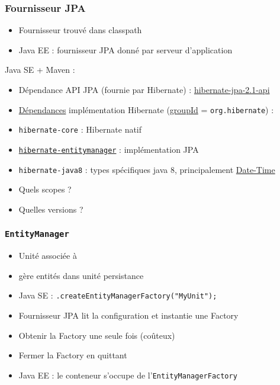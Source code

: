 \documentclass[english, french]{beamer}
\begin{document}
\begin{frame}
	\frametitle{Fournisseur JPA}
	\begin{itemize}
		\item Fournisseur trouvé dans classpath
		\item Java EE : fournisseur JPA donné par serveur d’application
	\end{itemize}
	Java SE + Maven :
	\begin{itemize}
		\item Dépendance API JPA (fournie par Hibernate) : \href{http://search.maven.org/\#search|gav|1|g\%3A\%22org.hibernate.javax.persistence\%22\%20AND\%20a\%3A\%22hibernate-jpa-2.1-api\%22}{hibernate-jpa-2.1-api}
		\item \href{http://docs.jboss.org/hibernate/orm/5.1/quickstart/html_single/\#_the_hibernate_modules_artifacts}{Dépendances} implémentation Hibernate {\tiny (\href{http://docs.jboss.org/hibernate/orm/5.1/quickstart/html_single/\#_maven_repository_artifacts}{groupId} = \texttt{org.hibernate})} :
		\item \texttt{hibernate-core} : Hibernate natif
		\item \href{http://search.maven.org/\#search|ga|1|g\%3A\%22org.hibernate\%22\%20AND\%20a\%3A\%22hibernate-entitymanager\%22}{\texttt{hibernate-entitymanager}} : implémentation JPA
		\item \texttt{hibernate-java8} : types spécifiques java 8{\tiny, principalement \href{https://docs.oracle.com/javase/tutorial/datetime/}{Date-Time}}
    		\item Quels scopes ?
		\item Quelles versions ?
	\end{itemize}
\end{frame}

\begin{frame}
	\frametitle{\texttt{EntityManager}}
	\begin{itemize}
		\item Unité associée à 
		\item {} gère entités dans unité persistance
		\item Java SE : {\small \texttt{.createEntityManagerFactory("MyUnit");}}
		\item Fournisseur JPA lit la configuration et instantie une Factory
		\item Obtenir la Factory une seule fois (coûteux)
		\item Fermer la Factory en quittant
		\item Java EE : le conteneur s’occupe de l’\texttt{EntityManagerFactory}
	\end{itemize}
\end{frame}
\end{document}
